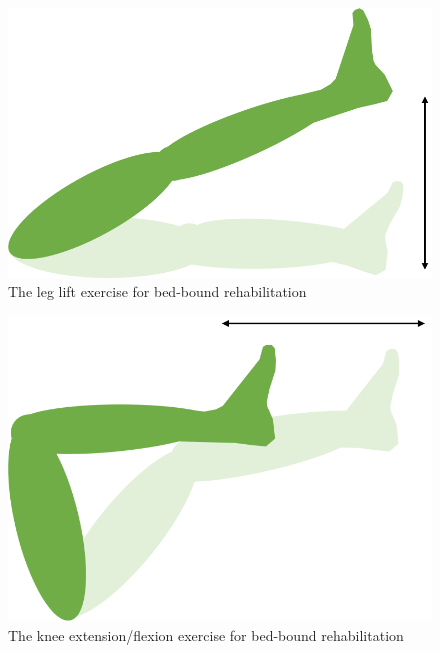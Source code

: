 \documentclass[12pt]{report}
\begin{document}
	\begin{figure}[h] 
		\centering
		\includegraphics[width=0.6\linewidth]{leg_lift}
		\caption{The leg lift exercise for bed-bound rehabilitation}
		\label{fig:leg_lift}
	\end{figure}
	
		\begin{figure}[h] 
		\centering
		\includegraphics[width=0.6\linewidth]{knee_extension}
		\caption{The knee extension/flexion exercise for bed-bound rehabilitation}
		\label{fig:knee_ext}
	\end{figure}
\end{document}
